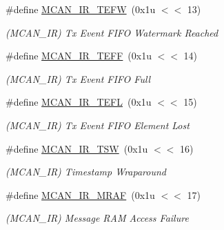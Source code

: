 \begin{DoxyCompactItemize}
\mbox{\label{group__SAME70__MCAN_ga1f183cea0db180f2259725a8a42bdab2}} 
\#define \mbox{\hyperlink{group__SAME70__MCAN_ga1f183cea0db180f2259725a8a42bdab2}{M\+C\+A\+N\+\_\+\+I\+R\+\_\+\+T\+E\+FW}}~(0x1u $<$$<$ 13)
\begin{DoxyCompactList}\small\item\em (M\+C\+A\+N\+\_\+\+IR) Tx Event F\+I\+FO Watermark Reached \end{DoxyCompactList}\item 
\mbox{\label{group__SAME70__MCAN_ga6f0507d76a8044b5cd23472f196fe0e3}} 
\#define \mbox{\hyperlink{group__SAME70__MCAN_ga6f0507d76a8044b5cd23472f196fe0e3}{M\+C\+A\+N\+\_\+\+I\+R\+\_\+\+T\+E\+FF}}~(0x1u $<$$<$ 14)
\begin{DoxyCompactList}\small\item\em (M\+C\+A\+N\+\_\+\+IR) Tx Event F\+I\+FO Full \end{DoxyCompactList}\item 
\mbox{\label{group__SAME70__MCAN_gabe48ec4aa72c7c6221063dda683f91ca}} 
\#define \mbox{\hyperlink{group__SAME70__MCAN_gabe48ec4aa72c7c6221063dda683f91ca}{M\+C\+A\+N\+\_\+\+I\+R\+\_\+\+T\+E\+FL}}~(0x1u $<$$<$ 15)
\begin{DoxyCompactList}\small\item\em (M\+C\+A\+N\+\_\+\+IR) Tx Event F\+I\+FO Element Lost \end{DoxyCompactList}\item 
\mbox{\label{group__SAME70__MCAN_gac0744661a9c2ed44e6d9f4231c71eaa4}} 
\#define \mbox{\hyperlink{group__SAME70__MCAN_gac0744661a9c2ed44e6d9f4231c71eaa4}{M\+C\+A\+N\+\_\+\+I\+R\+\_\+\+T\+SW}}~(0x1u $<$$<$ 16)
\begin{DoxyCompactList}\small\item\em (M\+C\+A\+N\+\_\+\+IR) Timestamp Wraparound \end{DoxyCompactList}\item 
\mbox{\label{group__SAME70__MCAN_ga09ad2d1b505ca0f945593b3b747fb4ca}} 
\#define \mbox{\hyperlink{group__SAME70__MCAN_ga09ad2d1b505ca0f945593b3b747fb4ca}{M\+C\+A\+N\+\_\+\+I\+R\+\_\+\+M\+R\+AF}}~(0x1u $<$$<$ 17)
\begin{DoxyCompactList}\small\item\em (M\+C\+A\+N\+\_\+\+IR) Message R\+AM Access Failure \end{DoxyCompactList}\item 
$$
\end{DoxyCompactItemize}

